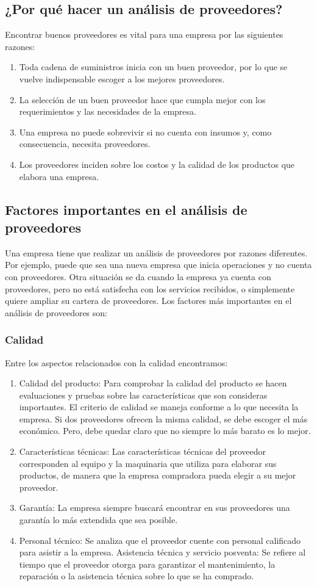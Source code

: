 \documentclass[../main]{subfiles}
\begin{document}
\subsection{¿Por qué hacer un análisis de proveedores?}
Encontrar buenos proveedores es vital para una empresa por las
siguientes razones:
\begin{enumerate}
  \item Toda cadena de suministros inicia con un buen proveedor, por
    lo que se vuelve indispensable escoger a los mejores proveedores.
  \item La selección de un buen proveedor hace que cumpla mejor con
    los requerimientos y las necesidades de la empresa.
  \item Una empresa no puede sobrevivir si no cuenta con insumos y,
    como consecuencia, necesita proveedores.
  \item Los proveedores inciden sobre los costos y la calidad de los
    productos que elabora una empresa.
\end{enumerate}
\subsection{Factores importantes en el análisis de proveedores}
Una empresa tiene que realizar un análisis de proveedores por razones
diferentes. Por ejemplo, puede que sea una nueva empresa que inicia
operaciones y no cuenta con proveedores. Otra situación se da cuando
la empresa ya cuenta con proveedores, pero no está satisfecha con
los servicios recibidos, o simplemente quiere ampliar su cartera de proveedores.
Los factores más importantes en el análisis de proveedores son:
\subsubsection{Calidad}
Entre los aspectos relacionados con la calidad encontramos:
\begin{enumerate}
  \item Calidad del producto: Para comprobar la calidad del producto
    se hacen evaluaciones y pruebas sobre las características que son
    consideras importantes. El criterio de calidad se maneja conforme
    a lo que necesita la empresa. Si dos proveedores ofrecen la misma
    calidad, se debe escoger el más económico. Pero, debe quedar
    claro que no siempre lo más barato es lo mejor.
  \item Características técnicas: Las características técnicas del
    proveedor corresponden al equipo y la maquinaria que utiliza para
    elaborar sus productos, de manera que la empresa compradora pueda
    elegir a su mejor proveedor.
  \item Garantía: La empresa siempre buscará encontrar en sus
    proveedores una garantía lo más extendida que sea posible.
  \item Personal técnico: Se analiza que el proveedor cuente con
    personal calificado para asistir a la empresa.
    Asistencia técnica y servicio posventa: Se refiere al tiempo que
    el proveedor otorga para garantizar el mantenimiento, la
    reparación o la asistencia técnica sobre lo que se ha comprado.
\end{enumerate}
\end{document}
